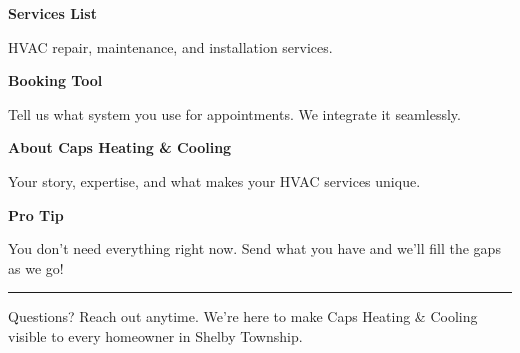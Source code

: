 \documentclass[11pt,letterpaper]{article}
\begin{document}
\begin{minipage}[t]{0.48\textwidth}
\begin{tcolorbox}[colframe=accent-teal, boxrule=1pt, left=0.7em, right=0.7em, top=0.5em, bottom=0.5em, arc=4pt, boxsep=0pt]
{\bfseries\small\color{accent-teal}Services List}

\vspace{0.15em}

{\small HVAC repair, maintenance, and installation services.}
\end{tcolorbox}

\vspace{0.1em}

\begin{tcolorbox}[colframe=accent-teal, boxrule=1pt, left=0.7em, right=0.7em, top=0.5em, bottom=0.5em, arc=4pt, boxsep=0pt]
{\bfseries\small\color{accent-teal}Booking Tool}

\vspace{0.15em}

{\small Tell us what system you use for appointments. We integrate it seamlessly.}
\end{tcolorbox}

\vspace{0.1em}

\begin{tcolorbox}[colframe=accent-teal, boxrule=1pt, left=0.7em, right=0.7em, top=0.5em, bottom=0.5em, arc=4pt, boxsep=0pt]
{\bfseries\small\color{accent-teal}About Caps Heating \& Cooling}

\vspace{0.15em}

{\small Your story, expertise, and what makes your HVAC services unique.}
\end{tcolorbox}

\vspace{-0.2em}
\end{minipage}

\vspace{0.15em}

\begin{tcolorbox}[colback={accent-red!5}, colframe=accent-red!20, boxrule=0.5pt, left=0.7em, right=0.7em, top=0.4em, bottom=0.4em, arc=6pt, boxsep=0pt]

{\bfseries\small\color{accent-red}Pro Tip}

\vspace{0.1em}

{\small You don't need everything right now. Send what you have and we'll fill the gaps as we go!}

\end{tcolorbox}

\vspace{0.15em}

\noindent\hrule
\vspace{0.2em}

{\small\color{text-light}Questions? Reach out anytime. We're here to make Caps Heating \& Cooling visible to every homeowner in Shelby Township.}
\end{document}
